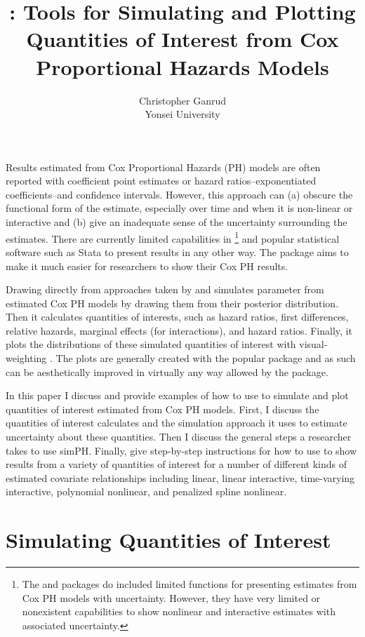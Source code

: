 \documentclass[nojss]{jss}\usepackage{graphicx, color}
\title{\pkg{simPH}: Tools for Simulating and Plotting Quantities of Interest from Cox Proportional Hazards Models}
\author{Christopher Ganrud\\Yonsei University}
\begin{document}
Results estimated from Cox Proportional Hazards (PH) models are often reported with coefficient point estimates or hazard ratios--exponentiated coefficients--and confidence intervals. However, this approach can (a) obscure the functional form of the estimate, especially over time and when it is non-linear or interactive and (b) give an inadequate sense of the uncertainty surrounding the estimates. There are currently limited capabilities in \footnote{The  \citep{R-survival} and  \citep{R-Zelig} packages do included limited functions for presenting estimates from Cox PH models with uncertainty. However, they have very limited or nonexistent capabilities to show nonlinear and interactive estimates with associated uncertainty.} and popular statistical software such as Stata to present results in any other way. The  \citep{R-simPH}  package aims to make it much easier for researchers to show their Cox PH results. 

Drawing directly from approaches taken by \cite{King2000} and \cite{Licht2011}  simulates parameter from estimated Cox PH models by drawing them from their posterior distribution. Then it calculates quantities of interests, such as hazard ratios, first differences, relative hazards, marginal effects (for interactions), and hazard ratios. Finally, it plots the distributions of these simulated quantities of interest with visual-weighting \citep{Hsiang2012}. The plots are generally created with the popular  package  \citep{R-ggplot2} and as such can be aesthetically improved in virtually any way allowed by the package.

In this paper I discuss and provide examples of how to use  to simulate and plot quantities of interest estimated from Cox PH models. First, I discuss the quantities of interest  calculates and the simulation approach it uses to estimate uncertainty about these quantities. Then I discuss the general steps a researcher takes to use simPH. Finally, give step-by-step instructions for how to use  to show results from a variety of quantities of interest for a number of different kinds of estimated covariate relationships including linear, linear interactive, time-varying interactive, polynomial nonlinear, and penalized spline nonlinear. 

\section{Simulating Quantities of Interest}
\end{document}
